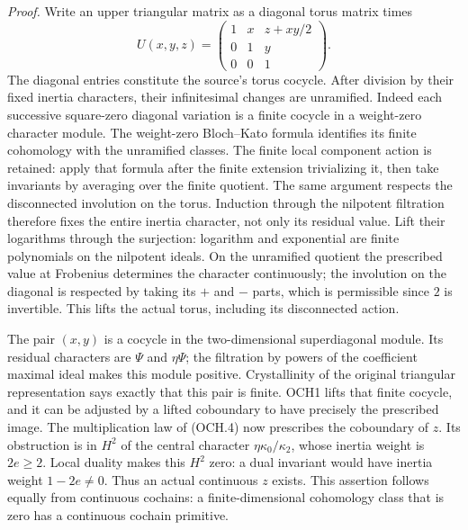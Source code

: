 \documentclass[11pt,a4paper]{article}
\numberwithin{equation}{section}
\theoremstyle{remark}\newtheorem{remark}[theorem]{Remark}
\begin{document}
\emph{Proof.}
Write an upper triangular matrix as a diagonal torus matrix times
\[
 U(x,y,z)=
 \begin{pmatrix}1&x&z+xy/2\\0&1&y\\0&0&1\end{pmatrix}.
 \tag{OCH.4}
\]
The diagonal entries constitute the source's torus cocycle.
After division by their fixed inertia characters, their infinitesimal
changes are unramified.  Indeed each successive square-zero diagonal
variation is a finite cocycle in a weight-zero character module.
The weight-zero Bloch--Kato formula identifies its finite cohomology
with the unramified classes.  The finite local component action is
retained: apply that formula after the finite extension trivializing
it, then take invariants by averaging over the finite quotient.
The same argument respects the disconnected involution on the torus.
Induction through the nilpotent filtration therefore fixes the entire
inertia character, not only its residual value.
Lift their logarithms through the surjection: logarithm and exponential are finite polynomials on the
nilpotent ideals.  On the unramified quotient the prescribed value
at Frobenius determines the character continuously; the involution
on the diagonal is respected by taking its \(+\) and \(-\)
parts, which is permissible since \(2\) is invertible.
This lifts the actual torus, including its disconnected action.

The pair \((x,y)\) is a cocycle in the two-dimensional
superdiagonal module.  Its residual characters are \(\Psi\)
and \(\eta\Psi\); the filtration by powers of the coefficient
maximal ideal makes this module positive.  Crystallinity of the
original triangular representation says exactly that this pair is
finite.  OCH1 lifts that finite cocycle, and it can be adjusted by a
lifted coboundary to have precisely the prescribed image.
The multiplication law of (OCH.4) now prescribes the coboundary of
\(z\).  Its obstruction is in \(H^2\) of the central character
\(\eta\kappa_0/\kappa_2\), whose inertia weight is \(2e\ge2\).
Local duality makes this \(H^2\) zero: a dual invariant would have
inertia weight \(1-2e\ne0\).  Thus an actual continuous \(z\)
exists.  This assertion follows equally from continuous cochains:
a finite-dimensional cohomology class that is zero has a continuous
cochain primitive.
\end{document}
